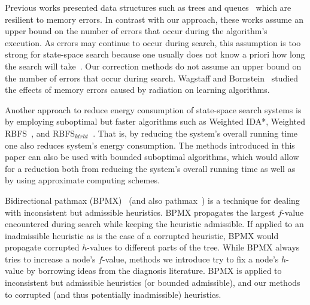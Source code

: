 \documentclass{article}
\begin{document}
Previous works presented data structures such as trees \cite{finocchi2007resilient} and queues~\cite{jorgensen2007priority} which are resilient to memory errors.
In contrast with our approach, these works %
assume an upper bound on the number of errors that occur during the algorithm's execution. As errors may continue to occur during search, this assumption is too strong for state-space search because one usually does not know a priori how long the search will take~\cite{Knuth75}. Our correction methods do not assume an upper bound on the number of errors that occur during search. 
%
Wagstaff and Bornstein~ studied the effects of memory errors caused by radiation on learning algorithms. %

Another approach to reduce energy consumption of state-space search systems is by employing suboptimal but faster algorithms such as Weighted IDA*, Weighted RBFS~\cite{Korf1992}, and RBFS$_{ktrht}$~\cite{hatem2015recursive}. That is, by reducing the system's overall running time one also reduces system's energy consumption. %
The methods introduced in this paper can also be used with bounded suboptimal algorithms, which would allow for a reduction both from reducing the system's overall running time as well as by using approximate computing schemes. 

Bidirectional pathmax (BPMX)~\cite{FelnerZHSSZ11} (and also pathmax~\cite{mero1984aHeuristicSearch}) is a technique for dealing with inconsistent but admissible heuristics. BPMX propagates the largest $f$-value encountered during search while keeping the heuristic admissible. If applied to an inadmissible heuristic as is the case of a corrupted heuristic, BPMX would propagate corrupted $h$-values to different parts of the tree. While BPMX always tries to increase a node's $f$-value, methods we introduce try to fix a node's $h$-value by borrowing ideas from the diagnosis literature. BPMX is applied to inconsistent but admissible heuristics (or bounded admissible), and our methods to corrupted (and thus potentially inadmissible) heuristics. 
\end{document}
